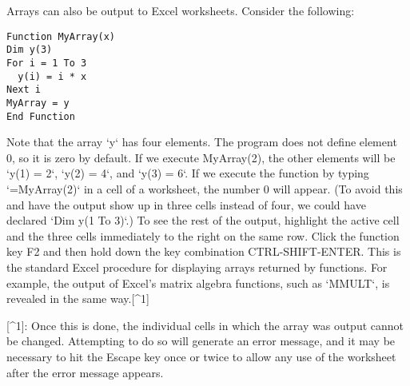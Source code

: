 Arrays can also be output to Excel worksheets.  Consider the following:
\small\begin{verbatim}
Function MyArray(x)
Dim y(3)
For i = 1 To 3
  y(i) = i * x
Next i
MyArray = y
End Function
\end{verbatim}\normalsize
Note that the array `y` has four elements. The program does not define
element 0, so it is zero by default. If we execute MyArray(2), the other
elements will be `y(1) = 2`, `y(2) = 4`, and `y(3) = 6`. If we execute
the function by typing `=MyArray(2)` in a cell of a worksheet, the
number 0 will appear. (To avoid this and have the output show up in
three cells instead of four, we could have declared `Dim y(1 To 3)`.) To
see the rest of the output, highlight the active cell and the three
cells immediately to the right on the same row. Click the function key
F2 and then hold down the key combination CTRL-SHIFT-ENTER. This is the
standard Excel procedure for displaying arrays returned by functions.
For example, the output of Excel's matrix algebra functions, such as
`MMULT`, is revealed in the same way.[^1]

[^1]: Once this is done, the individual cells in which the array was
    output cannot be changed. Attempting to do so will generate an error
    message, and it may be necessary to hit the Escape key once or twice
    to allow any use of the worksheet after the error message appears.

